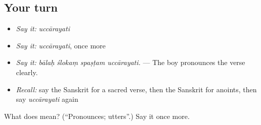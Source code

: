 \subsection*{Your turn}
\begin{itemize}
\raggedright
  \item \emph{Say it:} \emph{uccārayati}
  \item \emph{Say it:} \emph{uccārayati}, once more
  \item \emph{Say it:} \emph{bālaḥ ślokaṃ spaṣṭam uccārayati.} — The boy pronounces the verse clearly.
  \item \emph{Recall:} say the Sanskrit for a sacred verse, then the Sanskrit for anoints, then say \emph{uccārayati} again
\end{itemize}

\begin{tcolorbox}[breakable,colback=teal!4,colframe=teal!35!black,title={Before you move on}]
What does  mean? (\textquotedblleft{}Pronounces; utters\textquotedblright{}.) Say it once more.
\end{tcolorbox}
